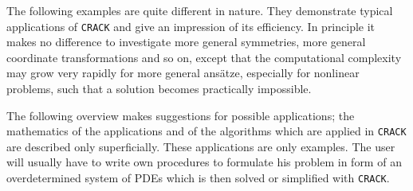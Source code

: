 The following examples are quite different in nature. They demonstrate
typical applications of {\tt CRACK} and give an impression of its efficiency.
In principle it makes no difference to investigate more general
symmetries, more general coordinate transformations and so on, except that the
computational complexity may grow very rapidly for more general
ans\"atze, especially for nonlinear problems, such that a solution
becomes practically impossible.  

The following overview makes suggestions for possible
applications; the mathematics of the applications and of the
algorithms which are applied in {\tt CRACK} are described only
superficially. These applications are only examples. The user will usually
have to write own procedures to formulate his problem in form of
an overdetermined system of PDEs which is then solved or simplified with
{\tt CRACK}.

